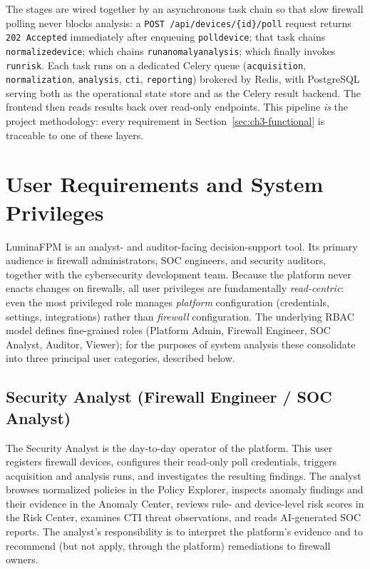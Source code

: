 \documentclass[12pt,a4paper]{report}
\renewcommand{\_}{\textunderscore\allowbreak}
\begin{document}
The stages are wired together by an asynchronous task chain so that slow firewall polling never blocks analysis: a \texttt{POST /api/devices/\{id\}/poll} request returns \texttt{202~Accepted} immediately after enqueuing \texttt{poll\_device}; that task chains \texttt{normalize\_device}; which chains \texttt{run\_anomaly\_analysis}; which finally invokes \texttt{run\_risk}. Each task runs on a dedicated Celery queue (\texttt{acquisition}, \texttt{normalization}, \texttt{analysis}, \texttt{cti}, \texttt{reporting}) brokered by Redis, with PostgreSQL serving both as the operational state store and as the Celery result backend. The frontend then reads results back over read-only endpoints. This pipeline \emph{is} the project methodology: every requirement in Section~\ref{sec:ch3-functional} is traceable to one of these layers.

\section{User Requirements and System Privileges}
\label{sec:ch3-users}

LuminaFPM is an analyst- and auditor-facing decision-support tool. Its primary audience is firewall administrators, SOC engineers, and security auditors, together with the cybersecurity development team. Because the platform never enacts changes on firewalls, all user privileges are fundamentally \emph{read-centric}: even the most privileged role manages \emph{platform} configuration (credentials, settings, integrations) rather than \emph{firewall} configuration. The underlying RBAC model defines fine-grained roles (Platform Admin, Firewall Engineer, SOC Analyst, Auditor, Viewer); for the purposes of system analysis these consolidate into three principal user categories, described below.

\subsection{Security Analyst (Firewall Engineer / SOC Analyst)}
\label{sec:ch3-user-analyst}
The Security Analyst is the day-to-day operator of the platform. This user registers firewall devices, configures their read-only poll credentials, triggers acquisition and analysis runs, and investigates the resulting findings. The analyst browses normalized policies in the Policy Explorer, inspects anomaly findings and their evidence in the Anomaly Center, reviews rule- and device-level risk scores in the Risk Center, examines CTI threat observations, and reads AI-generated SOC reports. The analyst's responsibility is to interpret the platform's evidence and to recommend (but not apply, through the platform) remediations to firewall owners.
\end{document}
